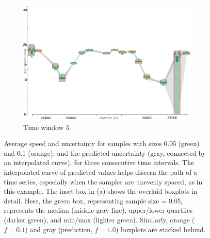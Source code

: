 \begin{figure}[h]
\begin{subfigure}{0.32\textwidth}
        \includegraphics[width=\textwidth]{images/sampling/timestep_c_samples_predicted.png}
        \caption{Time window 3.}
        \label{fig:c}
    \end{subfigure}
     \caption{Average speed and uncertainty for samples with sizes 0.05 (green) and 0.1 (orange), and the predicted uncertainty (gray, connected by an interpolated curve), for three consecutive time intervals. The interpolated curve of predicted values helps discern the path of a time series, especially when the samples are unevenly spaced, as in this example. The inset box in (a) shows the overlaid boxplots in detail. Here, the green box, representing sample size = 0.05, represents the median (middle gray line), upper/lower quartiles (darker green), and min/max (lighter green). Similarly, orange ($f=0.1$) and gray (prediction, $f=1.0$) boxplots are stacked behind.}
     \label{traffic_predicted}
\end{figure}

